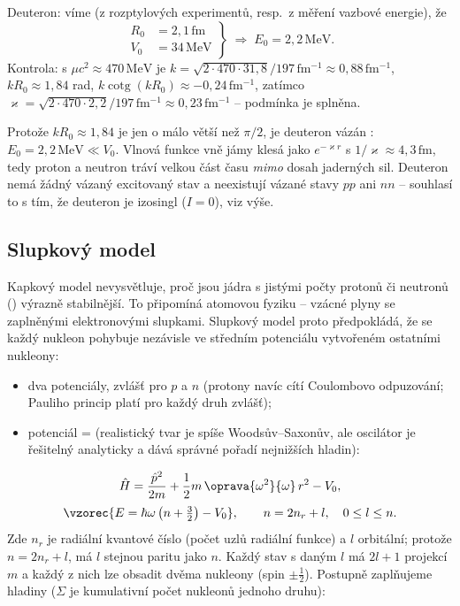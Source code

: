 \begin{priklad}[Deuteron]
Deuteron: víme (z rozptylových experimentů, resp.\ z měření vazbové
energie), že
\[
  \left.\begin{aligned}
    R_0 &= 2{,}1\,\mathrm{fm}\\
    V_0 &= 34\,\mathrm{MeV}
  \end{aligned}\right\}\;\Rightarrow\; E_0 = 2{,}2\,\mathrm{MeV} .
\]
Kontrola: s \(\mu c^2\approx 470\,\mathrm{MeV}\) je
\(k = \sqrt{2\cdot470\cdot31{,}8}/197\,\mathrm{fm^{-1}}\approx0{,}88\,\mathrm{fm^{-1}}\),
\(kR_0\approx1{,}84\) rad, \(k\operatorname{cotg}(kR_0)\approx-0{,}24\,\mathrm{fm^{-1}}\),
zatímco \(\varkappa=\sqrt{2\cdot470\cdot2{,}2}/197\,\mathrm{fm^{-1}}\approx0{,}23\,\mathrm{fm^{-1}}\)
-- podmínka je splněna.
\end{priklad}

\begin{vysvetleni}
Protože \(kR_0\approx1{,}84\) je jen o málo větší než \(\pi/2\), je deuteron
vázán : \(E_0=2{,}2\,\mathrm{MeV}\ll V_0\). Vlnová funkce vně jámy
klesá jako \(e^{-\varkappa r}\) s \(1/\varkappa\approx4{,}3\,\mathrm{fm}\),
tedy proton a neutron tráví velkou část času \emph{mimo} dosah jaderných sil.
Deuteron nemá žádný vázaný excitovaný stav a neexistují vázané stavy
\(pp\) ani \(nn\) -- souhlasí to s tím, že deuteron je izosingl
(\(I=0\)), viz výše.
\end{vysvetleni}

\subsection{Slupkový model}

Kapkový model nevysvětluje, proč jsou jádra s jistými počty protonů či
neutronů () výrazně stabilnější. To připomíná atomovou
fyziku -- vzácné plyny se zaplněnými elektronovými slupkami. Slupkový model
proto předpokládá, že se každý nukleon pohybuje nezávisle ve středním
potenciálu vytvořeném ostatními nukleony:
\begin{itemize}
  \item dva potenciály, zvlášť pro \(p\) a \(n\) (protony navíc cítí
    Coulombovo odpuzování; Pauliho princip platí pro každý druh zvlášť);
  \item potenciál =  (realistický tvar je spíše
    Woodsův--Saxonův, ale oscilátor je řešitelný analyticky a dává správné
    pořadí nejnižších hladin):
\end{itemize}
\[
  \hat H = \frac{\hat p^2}{2m} + \frac12 m\,\oprava{\omega^2}{\omega}\,r^2 - V_0 ,
\]
\[
  \vzorec{E = \hbar\omega\left(n + \tfrac32\right) - V_0},
  \qquad n = 2n_r + l, \quad 0\le l\le n .
\]
Zde \(n_r\) je radiální kvantové číslo (počet uzlů radiální funkce) a \(l\)
orbitální; protože \(n=2n_r+l\), má \(l\) stejnou paritu jako \(n\). Každý
stav s daným \(l\) má \(2l+1\) projekcí \(m\) a každý z nich lze obsadit
dvěma nukleony (spin \(\pm\tfrac12\)). Postupně zaplňujeme hladiny
(\(\Sigma\) je kumulativní počet nukleonů jednoho druhu):


